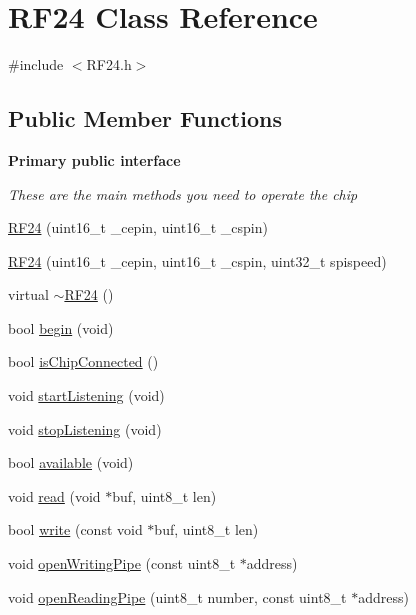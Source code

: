 \hypertarget{classRF24}{}\section{R\+F24 Class Reference}
\label{classRF24}


{\ttfamily \#include $<$R\+F24.\+h$>$}

\subsection*{Public Member Functions}
\begin{Indent}\textbf{ Primary public interface}\par
{\em These are the main methods you need to operate the chip }\begin{DoxyCompactItemize}
\item 
\hyperlink{classRF24_af564e19261afb56005d2411d0c7b05de}{R\+F24} (uint16\+\_\+t \+\_\+cepin, uint16\+\_\+t \+\_\+cspin)
\item 
\hyperlink{classRF24_a085d99c986effa19b01c030e2b1439ce}{R\+F24} (uint16\+\_\+t \+\_\+cepin, uint16\+\_\+t \+\_\+cspin, uint32\+\_\+t spispeed)
\item 
virtual \hyperlink{classRF24_a56311ab4c4042525c166e81e0a09890c}{$\sim$\+R\+F24} ()
\item 
bool \hyperlink{classRF24_a048a20c73c7d9b2e02dcbae6fb9c4ba8}{begin} (void)
\item 
bool \hyperlink{classRF24_ac224c55270d26dbe7b4f3492ea3056b5}{is\+Chip\+Connected} ()
\item 
void \hyperlink{classRF24_a30a2733a3889bdc331fe2d2f4f0f7b39}{start\+Listening} (void)
\item 
void \hyperlink{classRF24_a6f144d73fc447c8ac2d1a4166210fd88}{stop\+Listening} (void)
\item 
bool \hyperlink{classRF24_a127105eb7a3b351cfe777c1cec50627a}{available} (void)
\item 
void \hyperlink{classRF24_a8e2eacacfba96426c192066f04054c5b}{read} (void $\ast$buf, uint8\+\_\+t len)
\item 
bool \hyperlink{classRF24_a4cd4c198a47704db20b6b5cf0731cd58}{write} (const void $\ast$buf, uint8\+\_\+t len)
\item 
void \hyperlink{classRF24_af2e409e62d49a23e372a70b904ae30e1}{open\+Writing\+Pipe} (const uint8\+\_\+t $\ast$address)
\item 
void \hyperlink{classRF24_a9edc910ccc1ffcff56814b08faca5535}{open\+Reading\+Pipe} (uint8\+\_\+t number, const uint8\+\_\+t $\ast$address)
\end{DoxyCompactItemize}
\end{Indent}
